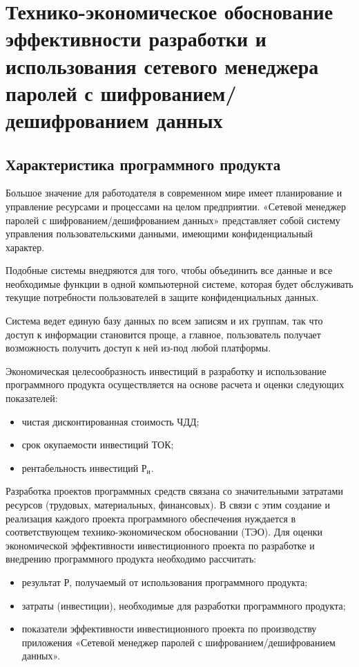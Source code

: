 \newcommand{\byr}{ тыс. бел. руб}

\section{Технико-экономическое обоснование эффективности разработки и использования сетевого менеджера паролей с шифрованием/дешифрованием данных}
\label{sec:econ}

\subsection{Характеристика программного продукта}
\label{sub:econ:desc}

Большое значение для работодателя в современном мире имеет планирование и управление ресурсами и процессами на целом предприятии.
«Сетевой менеджер паролей с шифрованием/дешифрованием данных» представляет собой систему управления пользовательскими данными, имеющими конфиденциальный характер.

Подобные системы внедряются для того, чтобы объединить все данные и все необходимые функции в одной компьютерной системе, которая будет обслуживать текущие потребности пользователей в защите конфиденциальных данных.

Система ведет единую базу данных по всем записям и их группам, так что доступ к информации становится проще, а главное, пользователь получает возможность получить доступ к ней из-под любой платформы.

Экономическая целесообразность инвестиций в разработку и использование программного продукта осуществляется на основе расчета и оценки следующих показателей:
\begin{itemize}
  \item чистая дисконтированная стоимость $ \text{ЧДД} $;
  \item срок окупаемости инвестиций $ \text{ТОК} $;
  \item рентабельность инвестиций $ \text{Р}_\text{и} $.
\end{itemize}

Разработка проектов программных средств связана со значительными затратами ресурсов (трудовых, материальных, финансовых). В связи с этим создание и реализация каждого проекта программного обеспечения нуждается в соответствующем технико-экономическом обосновании (ТЭО).
Для оценки экономической эффективности инвестиционного проекта по разработке и внедрению программного продукта необходимо рассчитать:
\begin{itemize}
  \item результат $ \text{Р} $, получаемый от использования программного продукта;
  \item затраты (инвестиции), необходимые для разработки программного продукта;
  \item показатели эффективности инвестиционного проекта по производству приложения «Сетевой менеджер паролей с шифрованием/дешифрованием данных».
\end{itemize}

